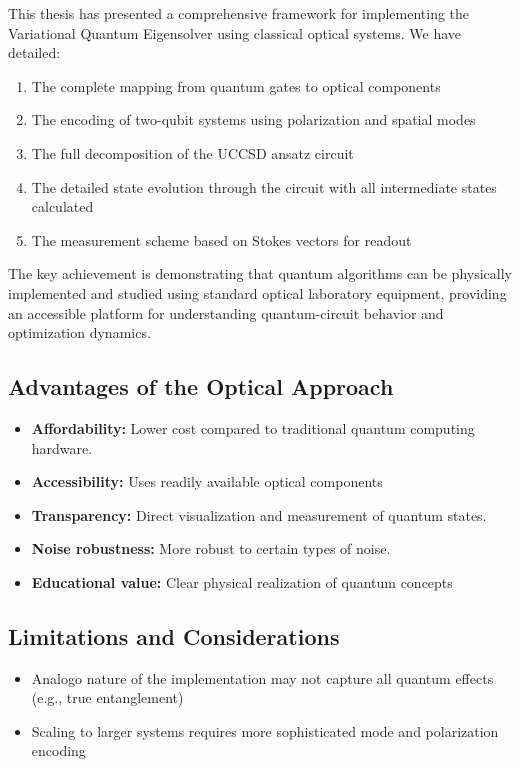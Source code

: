\documentclass[
	a4paper,
	12pt,
	oneside,
]{article}
\begin{document}
This thesis has presented a comprehensive framework for implementing the Variational Quantum Eigensolver using classical optical systems. We have detailed:

\begin{enumerate}
	\item The complete mapping from quantum gates to optical components
	\item The encoding of two-qubit systems using polarization and spatial modes
	\item The full decomposition of the UCCSD ansatz circuit
	\item The detailed state evolution through the circuit with all intermediate states calculated
	\item The measurement scheme based on Stokes vectors for readout
\end{enumerate}

The key achievement is demonstrating that quantum algorithms can be physically implemented and studied using standard optical laboratory equipment, providing an accessible platform for understanding quantum-circuit behavior and optimization dynamics.

\subsection{Advantages of the Optical Approach}

\begin{itemize}
    \item \textbf{Affordability:} Lower cost compared to traditional quantum computing hardware.
 	\item \textbf{Accessibility:} Uses readily available optical components
	\item \textbf{Transparency:} Direct visualization and measurement of quantum states.
	\item \textbf{Noise robustness:} More robust to certain types of noise.
	\item \textbf{Educational value:} Clear physical realization of quantum concepts
\end{itemize}

\subsection{Limitations and Considerations}

\begin{itemize}
    \item Analogo nature of the implementation may not capture all quantum effects (e.g., true entanglement)
	\item Scaling to larger systems requires more sophisticated mode and polarization encoding
\end{itemize}
\end{document}
